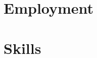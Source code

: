 \documentclass[11pt]{moderncv}
\begin{document}
\maketitle

\section{Employment}



\section{Skills}



% 
\end{document}
